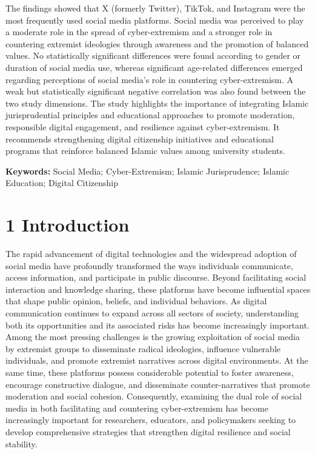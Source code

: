 \documentclass[11pt,a4paper]{article}
\begin{document}
	The findings showed that X (formerly Twitter), TikTok, and Instagram were the most frequently used social media platforms. Social media was perceived to play a moderate role in the spread of cyber-extremism and a stronger role in countering extremist ideologies through awareness and the promotion of balanced values. No statistically significant differences were found according to gender or duration of social media use, whereas significant age-related differences emerged regarding perceptions of social media's role in countering cyber-extremism. A weak but statistically significant negative correlation was also found between the two study dimensions. The study highlights the importance of integrating Islamic jurisprudential principles and educational approaches to promote moderation, responsible digital engagement, and resilience against cyber-extremism. It recommends strengthening digital citizenship initiatives and educational programs that reinforce balanced Islamic values among university students.
	
	\textbf{Keywords: }Social Media; Cyber-Extremism; Islamic Jurisprudence; Islamic Education; Digital Citizenship
	
	\section{1 Introduction}
	
	The rapid advancement of digital technologies and the widespread adoption of social media have profoundly transformed the ways individuals communicate, access information, and participate in public discourse. Beyond facilitating social interaction and knowledge sharing, these platforms have become influential spaces that shape public opinion, beliefs, and individual behaviors. As digital communication continues to expand across all sectors of society, understanding both its opportunities and its associated risks has become increasingly important. Among the most pressing challenges is the growing exploitation of social media by extremist groups to disseminate radical ideologies, influence vulnerable individuals, and promote extremist narratives across digital environments. At the same time, these platforms possess considerable potential to foster awareness, encourage constructive dialogue, and disseminate counter-narratives that promote moderation and social cohesion. Consequently, examining the dual role of social media in both facilitating and countering cyber-extremism has become increasingly important for researchers, educators, and policymakers seeking to develop comprehensive strategies that strengthen digital resilience and social stability.
	
\end{document}
